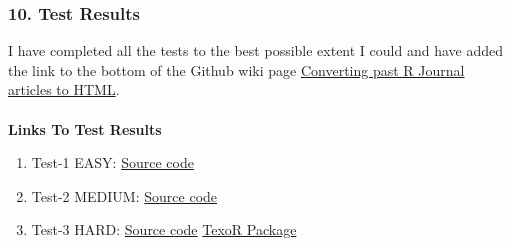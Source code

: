 \documentclass[12pt]{article}
\begin{document}
\subsubsection{10. Test Results}
I have completed all the tests to the best possible extent I could and have added the link to the bottom of the Github wiki page  \href{https://github.com/rstats-gsoc/gsoc2022/wiki/Converting-past-R-Journal-articles-to-HTML}{\color{orange}Converting past R Journal articles to HTML}.\\
\\
{\large\bfseries Links To Test Results}\\

\begin{enumerate}[label = {  \color{MediumBlue} \textbf{\arabic*. }},align=left]
 \item {\color{MediumBlue} Test-1 EASY}: \href{https://github.com/Abhi-1U/GSoC_22_R_Converting-past-R-Journal-articles-to-HTML/tree/main/Test-1}{\color{orange}Source code}
 \item {\color{MediumBlue} Test-2 MEDIUM}: \href{https://github.com/Abhi-1U/GSoC_22_R_Converting-past-R-Journal-articles-to-HTML/tree/main/Test-2}{\color{orange}Source code}
 \item {\color{MediumBlue} Test-3 HARD}: \href{https://github.com/Abhi-1U/GSoC_22_R_Converting-past-R-Journal-articles-to-HTML/tree/main/Test-3}{\color{orange}Source code} \href{https://github.com/Abhi-1U/TexoR}{\color{orange}TexoR Package} 
\end{enumerate}

 


\end{document}
